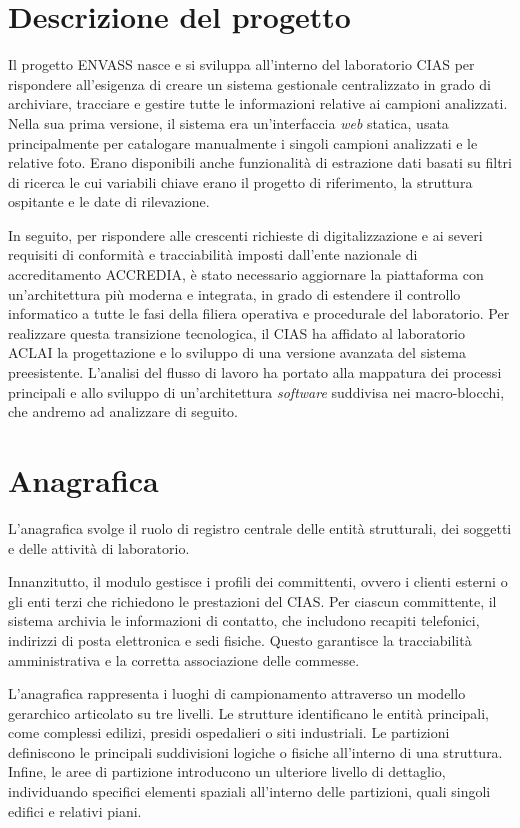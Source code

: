 \section{Descrizione del progetto}
Il progetto ENVASS nasce e si sviluppa all’interno del laboratorio CIAS per rispondere all'esigenza di creare un sistema gestionale centralizzato in grado di archiviare, tracciare e gestire tutte le informazioni relative ai campioni analizzati. Nella sua prima versione, il sistema era un'interfaccia \textit{web} statica, usata principalmente per catalogare manualmente i singoli campioni analizzati e le relative foto. Erano disponibili anche funzionalità di estrazione dati basati su filtri di ricerca le cui variabili chiave erano il progetto di riferimento, la struttura ospitante e le date di rilevazione.

In seguito, per rispondere alle crescenti richieste di digitalizzazione e ai severi requisiti di conformità e tracciabilità imposti dall'ente nazionale di accreditamento ACCREDIA, è stato necessario aggiornare la piattaforma con un'architettura più moderna e integrata, in grado di estendere il controllo informatico a tutte le fasi della filiera operativa e procedurale del laboratorio.  
Per realizzare questa transizione tecnologica, il CIAS ha affidato al laboratorio ACLAI la progettazione e lo sviluppo di una versione avanzata del sistema preesistente. L'analisi del flusso di lavoro ha portato alla mappatura dei processi principali e allo sviluppo di un'architettura \textit{software} suddivisa nei macro-blocchi, che andremo ad analizzare di seguito.


\section{Anagrafica}
L’anagrafica svolge il ruolo di registro centrale delle entità strutturali, dei soggetti e delle attività di laboratorio. 

Innanzitutto, il modulo gestisce i profili dei committenti, ovvero i clienti esterni o gli enti terzi che richiedono le prestazioni del CIAS. Per ciascun committente, il sistema archivia le informazioni di contatto, che includono recapiti telefonici, indirizzi di posta elettronica e sedi fisiche. Questo garantisce la tracciabilità amministrativa e la corretta associazione delle commesse. 

L'anagrafica rappresenta i luoghi di campionamento attraverso un modello gerarchico articolato su tre livelli. Le strutture identificano le entità principali, come complessi edilizi, presidi ospedalieri o siti industriali. Le partizioni definiscono le principali suddivisioni logiche o fisiche all’interno di una struttura. Infine, le aree di partizione introducono un ulteriore livello di dettaglio, individuando specifici elementi spaziali all'interno delle partizioni, quali singoli edifici e relativi piani.

